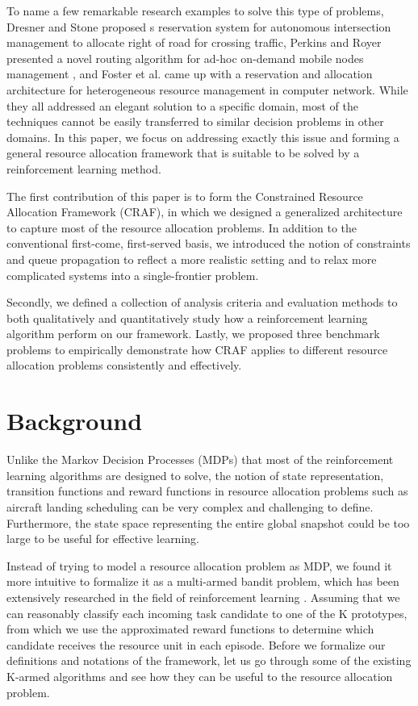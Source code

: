 \documentclass[conference]{IEEEtran}
\begin{document}
To name a few remarkable research examples to solve this type of problems, Dresner and Stone proposed s reservation system for autonomous intersection management \cite{dresner2008} to allocate right of road for crossing traffic, Perkins and Royer presented a novel routing algorithm for ad-hoc on-demand mobile nodes management \cite{perkins1999}, and Foster et al. came up with a reservation and allocation architecture for heterogeneous resource management in computer network. While they all addressed an elegant solution to a specific domain, most of the techniques cannot be easily transferred to similar decision problems in other domains. In this paper, we focus on addressing exactly this issue and forming a general resource allocation framework that is suitable to be solved by a reinforcement learning method.

The first contribution of this paper is to form the Constrained Resource Allocation Framework (CRAF), in which we designed a generalized architecture to capture most of the resource allocation problems. In addition to the conventional first-come, first-served basis, we introduced the notion of constraints and queue propagation to reflect a more realistic setting and to relax more complicated systems into a single-frontier problem.

Secondly, we defined a collection of analysis criteria and evaluation methods to both qualitatively and quantitatively study how a reinforcement learning algorithm perform on our framework. Lastly, we proposed three benchmark problems to empirically demonstrate how CRAF applies to different resource allocation problems consistently and effectively.


\section{Background}

Unlike the Markov Decision Processes (MDPs) that most of the reinforcement learning algorithms are designed to solve, the notion of state representation, transition functions and reward functions in resource allocation problems such as aircraft landing scheduling can be very complex and challenging to define. Furthermore, the state space representing the entire global snapshot could be too large to be useful for effective learning. 

Instead of trying to model a resource allocation problem as MDP, we found it more intuitive to formalize it as a multi-armed bandit problem, which has been extensively researched in the field of reinforcement learning \cite{auer2002}. Assuming that we can reasonably classify each incoming task candidate to one of the K prototypes, from which we use the approximated reward functions to determine which candidate receives the resource unit in each episode. Before we formalize our definitions and notations of the framework, let us go through some of the existing K-armed algorithms and see how they can be useful to the resource allocation problem.
\end{document}
